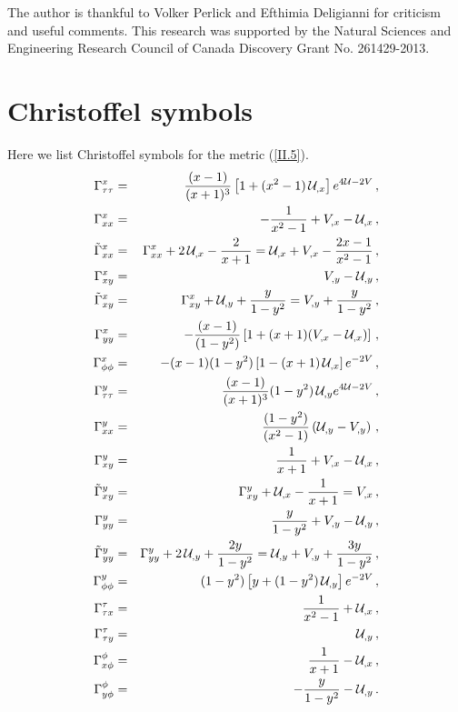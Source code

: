 \documentclass[twocolumn,showpacs,preprintnumbers,amsmath,amssymb,floatfix,nofootinbib]{revtex4-1}
\newcommand{\ba}{\begin{eqnarray}}
\newcommand{\ea}{\end{eqnarray}}
\newcommand{\non}{\nonumber}
\newcommand{\eq}[1]{(\ref{#1})}
\newcommand{\n}[1]{\label{#1}}
\newcommand{\cu}{{\cal U}}
\begin{document}
\begin{acknowledgments}

The author is thankful to Volker Perlick and Efthimia Deligianni for criticism and useful comments. This research was supported  by the Natural Sciences and Engineering Research Council of Canada Discovery Grant No. 261429-2013.

\end{acknowledgments}
 
\appendix*

\section{Christoffel symbols}

Here we list Christoffel symbols for the metric \eq{II.5}.
\allowdisplaybreaks
\ba\n{A1}
\Gamma^{x}_{\tau\tau}&=&\frac {( x-1)}{( x+1) ^{3}}\left[1+ ({x}^{2}-1)\,\cu_{,x}\right]e^{4\cu-2V}\,,\non\\
\Gamma^{x}_{xx}&=&-\frac{1}{x^{2}-1}+V_{,x}-\cu_{,x}\,,\non\\
\tilde{\Gamma}^{x}_{xx}&=&\Gamma^{x}_{xx}+2\,\cu_{,x}-\frac{2}{x+1}=\cu_{,x}+V_{,x}-\frac{2x-1}{x^2-1}\,,\non\\
\Gamma^{x}_{xy}&=&V_{,y}-\cu_{,y}\,,\non\\
\tilde{\Gamma}^{x}_{xy}&=&\Gamma^{x}_{xy}+\cu_{,y}+\frac{y}{1-y^2}=V_{,y}+\frac{y}{1-y^2}\,,\non\\
\Gamma^{x}_{yy}&=&-\frac {( x-1)}{(1-y^{2})}\left[1+(x+1)(V_{,x}-\cu_{,x})\right]\,,\non\\
\Gamma^{x}_{\phi\phi}&=&-(x-1)(1-y^{2})\left[1-(x+1)\,\cu_{,x}\right]e^{-2V}\,,\non\\
\Gamma^{y}_{\tau\tau}&=&\frac{( x-1)}{(x+1) ^{3}}(1-{y}^{2})\,\cu_{,y}e^{4\cu-2V}\,,\non\\ 
\Gamma^{y}_{xx}&=&\frac{(1-y^{2})}{(x^{2}-1)}\left(\cu_{,y} -V_{,y}\right)\,,\non\\
\Gamma^{y}_{xy}&=&\frac{1}{x+1}+V_{,x}-\cu_{,x}\,,\non\\
\tilde{\Gamma}^{y}_{xy}&=&\Gamma^{y}_{xy}+\cu_{,x}-\frac{1}{x+1}=V_{,x}\,,\non\\
\Gamma^{y}_{yy}&=&\frac{y}{1-y^{2}}+V_{,y}-\cu_{,y}\,,\non\\
\tilde{\Gamma}^{y}_{yy}&=&\Gamma^{y}_{yy}+2\,\cu_{,y}+\frac{2y}{1-y^{2}}=\cu_{,y}+V_{,y}+\frac{3y}{1-y^{2}}\,,\non\\
\Gamma^{y}_{\phi\phi}&=&(1-y^{2})\left[y+(1-y^{2})\,\cu_{,y}\right]e^{-2V}\,,\non\\
\Gamma^{\tau}_{\tau x}&=&\frac{1}{x^2-1}+\cu_{,x}\,,\non\\
\Gamma^{\tau}_{\tau y}&=&\cu_{,y}\,,\non\\
\Gamma^{\phi}_{x\phi}&=&\frac{1}{x+1}-\cu_{,x}\,,\non\\
\Gamma^{\phi}_{y\phi}&=&-\frac{y}{1-y^2}-\cu_{,y}\,.\non
\ea
\end{document}
